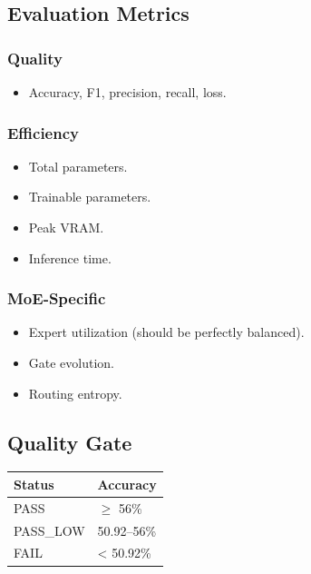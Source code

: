 \subsection{Evaluation Metrics}

\subsubsection{Quality}
\begin{itemize}
\item Accuracy, F1, precision, recall, loss.

\end{itemize}
\subsubsection{Efficiency}
\begin{itemize}
\item Total parameters.
\item Trainable parameters.
\item Peak VRAM.
\item Inference time.

\end{itemize}
\subsubsection{MoE-Specific}
\begin{itemize}
\item Expert utilization (should be perfectly balanced).
\item Gate evolution.
\item Routing entropy.

\end{itemize}
\subsection{Quality Gate}

\begin{table}[H]
\centering
\small
\begin{tabular}{ll}
\toprule
\textbf{Status} & \textbf{Accuracy} \\
\midrule
PASS & $\ge$ 56\% \\
PASS\_LOW & 50.92--56\% \\
FAIL & \textless{} 50.92\% \\
\bottomrule
\end{tabular}
\end{table}

